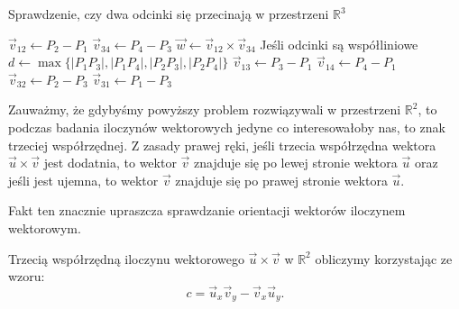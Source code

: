 \begin{algorithm}[H]
	\caption{Sprawdzenie, czy dwa odcinki się przecinają w przestrzeni $\mathbb{R}^3$}
	\begin{algorithmic}[1]
		\State \Return \true
		\EndIf
		\State $\vec{v}_{12} \gets P_2 - P_1$
		\State $\vec{v}_{34} \gets P_4 - P_3$
		\State $\vec{w} \gets \vec{v}_{12} \times \vec{v}_{34}$	
		 \Comment Jeśli odcinki są współliniowe
		\State $d \gets \max\{|P_1P_3|, |P_1P_4|, |P_2P_3|, |P_2P_4|\}$
		\State \Return \true
		\EndIf
		\EndIf
		\State $\vec{v}_{13} \gets P_3 - P_1$
		\State $\vec{v}_{14} \gets P_4 - P_1$
		\State \Return \false
		\EndIf
		\State $\vec{v}_{32} \gets P_2 - P_3$
		\State $\vec{v}_{31} \gets P_1 - P_3$
		\State \Return \false
		\EndIf
		\State \Return \true
		\EndProcedure
	\end{algorithmic}
	\label{segment_intersection_r3}
\end{algorithm}

Zauważmy, że gdybyśmy powyższy problem rozwiązywali w przestrzeni $\mathbb{R}^2$,
to podczas badania iloczynów wektorowych jedyne co interesowałoby nas,
to znak trzeciej współrzędnej. Z zasady prawej ręki, jeśli
trzecia współrzędna wektora 
$\vec{u} \times \vec{v}$ jest dodatnia, to wektor $\vec{v}$
znajduje się po lewej stronie wektora $\vec{u}$ oraz jeśli 
jest ujemna, to wektor $\vec{v}$
znajduje się po prawej stronie wektora $\vec{u}$. 

Fakt ten znacznie upraszcza sprawdzanie orientacji wektorów iloczynem wektorowym.

Trzecią współrzędną iloczynu wektorowego $\vec{u} \times \vec{v}$ w $\mathbb{R}^2$
obliczymy korzystając ze wzoru:
\[c = \vec{u}_x \vec{v}_y - \vec{v}_x \vec{u}_y.\]



